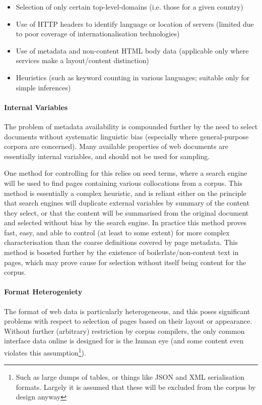\begin{itemize}
    \item Selection of only certain top-level-domains (i.e. those for a given country)
    \item Use of HTTP headers to identify language or location of servers (limited due to poor coverage of internationalisation technologies)
    \item Use of metadata and non-content HTML body data (applicable only where services make a layout/content distinction)
    \item Heuristics (such as keyword counting in various languages; suitable only for simple inferences)
\end{itemize}


\paragraph{Internal Variables}
The problem of metadata availability is compounded further by the need to select documents without systematic linguistic bias (especially where general-purpose corpora are concerned).  Many available properties of web documents are essentially internal variables, and should not be used for sampling.

One method for controlling for this relies on seed terms, where a search engine will be used to find pages containing various collocations from a corpus.  This method is essentially a complex heuristic, and is reliant either on the principle that search engines will duplicate external variables by summary of the content they select, or that the content will be summarised from the original document and selected without bias by the search engine.  In practice this method proves fast, easy, and able to control (at least to some extent) for more complex characterisation than the coarse definitions covered by page metadata.  This method is boosted further by the existence of boilerlate/non-content text in pages, which may prove cause for selection without itself being content for the corpus.

\paragraph{Format Heterogeniety}
The format of web data is particularly heterogeneous, and this poses significant problems with respect to selection of pages based on their layout or appearance.  Without further (arbitrary) restriction by corpus compilers, the only common interface data online is designed for is the human eye (and some content even violates this assumption\footnote{Such as large dumps of tables, or things like JSON and XML serialisation formats.  Largely it is assumed that these will be excluded from the corpus by design anyway}).  

